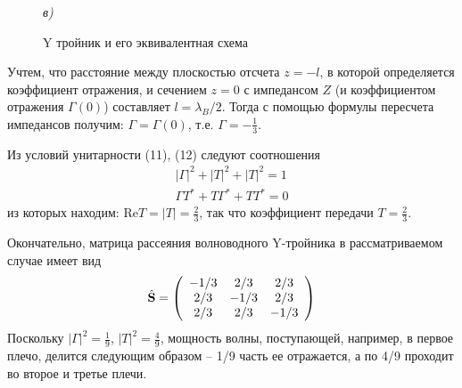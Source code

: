 ﻿\documentclass[a4paper,11pt]{article}
\begin{document}
\begin{figure}[h!]
\begin{minipage}[t][5cm][t]{0.47\textwidth}
	\end{minipage}
	\vfill
	\begin{center}
	\begin{minipage}[t][7cm][b]{0.6\textwidth}
	 \textit{в)} \\
	\end{minipage}		
	\end{center}
	\caption{Y тройник и его эквивалентная схема}
	\label{fig:fig2}
\end{figure}


Учтем, что расстояние между плоскостью отсчета $z=-l$, в которой определяется коэффициент отражения, и сечением $z=0$ с импедансом $Z$ (и коэффициентом отражения $\Gamma(0)$) составляет $l=\lambda_B/2$. 
Тогда с помощью формулы пересчета импедансов получим:  $\Gamma = \Gamma(0)$, т.е.  $\Gamma=-\frac13$.

Из условий унитарности (11), (12) следуют соотношения
\begin{equation}
	\begin{array} { c } { | \Gamma | ^ { 2 } + | T | ^ { 2 } + | T | ^ { 2 } = 1 } \\ { \Gamma T ^ { * } + T \Gamma ^ { * } + T T ^ { * } = 0 } \end{array}
\end{equation}
из которых находим: $\mathrm{Re} T = |T| = \frac23$, так что коэффициент передачи $T=\frac23$.

Окончательно, матрица рассеяния волноводного Y-тройника в рассматриваемом случае имеет вид
\begin{equation}
	\hat { \mathbf { S } } = \left( \begin{array} { c c c } { - 1 / 3 } & { 2 / 3 } & { 2 / 3 } \\ { 2 / 3 } & { - 1 / 3 } & { 2 / 3 } \\ { 2 / 3 } & { 2 / 3 } & { - 1 / 3 } \end{array} \right)
\end{equation}
Поскольку $|\Gamma|^2=\frac19$,  $|T|^2=\frac49$, мощность волны, поступающей, например, в первое плечо, делится следующим образом -- 1/9 часть ее отражается, а по 4/9 проходит во второе и третье плечи.
\end{document}
